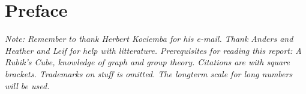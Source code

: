 \chapter*{Preface}
\textit{Note: Remember to thank Herbert Kociemba for his e-mail. Thank Anders and Heather and Leif for help with litterature. Prerequisites for reading this report: A Rubik's Cube, knowledge of graph and group theory. Citations are with square brackets. Trademarks on stuff is omitted. The longterm scale for long numbers will be used.}
